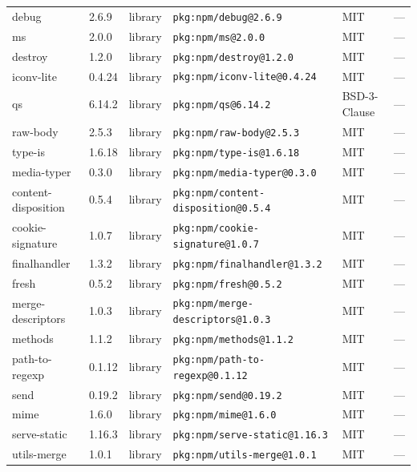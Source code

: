 \documentclass[11pt,a4paper]{article}
\begin{document}
\begin{longtable}{|p{4cm}|p{2cm}|p{1.6cm}|p{5cm}|p{1.5cm}|p{3.5cm}|}
\raggedright debug & 2.6.9 & library & \small\texttt{pkg:npm/debug@2.6.9} & MIT & \small — \\
\raggedright ms & 2.0.0 & library & \small\texttt{pkg:npm/ms@2.0.0} & MIT & \small — \\
\raggedright destroy & 1.2.0 & library & \small\texttt{pkg:npm/destroy@1.2.0} & MIT & \small — \\
\raggedright iconv-lite & 0.4.24 & library & \small\texttt{pkg:npm/iconv-lite@0.4.24} & MIT & \small — \\
\raggedright qs & 6.14.2 & library & \small\texttt{pkg:npm/qs@6.14.2} & BSD-3-Clause & \small — \\
\raggedright raw-body & 2.5.3 & library & \small\texttt{pkg:npm/raw-body@2.5.3} & MIT & \small — \\
\raggedright type-is & 1.6.18 & library & \small\texttt{pkg:npm/type-is@1.6.18} & MIT & \small — \\
\raggedright media-typer & 0.3.0 & library & \small\texttt{pkg:npm/media-typer@0.3.0} & MIT & \small — \\
\raggedright content-disposition & 0.5.4 & library & \small\texttt{pkg:npm/content-disposition@0.5.4} & MIT & \small — \\
\raggedright cookie-signature & 1.0.7 & library & \small\texttt{pkg:npm/cookie-signature@1.0.7} & MIT & \small — \\
\raggedright finalhandler & 1.3.2 & library & \small\texttt{pkg:npm/finalhandler@1.3.2} & MIT & \small — \\
\raggedright fresh & 0.5.2 & library & \small\texttt{pkg:npm/fresh@0.5.2} & MIT & \small — \\
\raggedright merge-descriptors & 1.0.3 & library & \small\texttt{pkg:npm/merge-descriptors@1.0.3} & MIT & \small — \\
\raggedright methods & 1.1.2 & library & \small\texttt{pkg:npm/methods@1.1.2} & MIT & \small — \\
\raggedright path-to-regexp & 0.1.12 & library & \small\texttt{pkg:npm/path-to-regexp@0.1.12} & MIT & \small — \\
\raggedright send & 0.19.2 & library & \small\texttt{pkg:npm/send@0.19.2} & MIT & \small — \\
\raggedright mime & 1.6.0 & library & \small\texttt{pkg:npm/mime@1.6.0} & MIT & \small — \\
\raggedright serve-static & 1.16.3 & library & \small\texttt{pkg:npm/serve-static@1.16.3} & MIT & \small — \\
\raggedright utils-merge & 1.0.1 & library & \small\texttt{pkg:npm/utils-merge@1.0.1} & MIT & \small — \\

\end{longtable}
\end{document}
